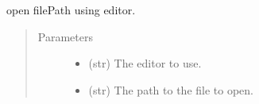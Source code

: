 \documentclass[a4paper,10pt,english]{sphinxmanual}
\begin{document}
\begin{fulllineitems}
\label{\detokenize{apidoc_src/src:src.system.show_in_editor}}
open filePath using editor.
\begin{quote}\begin{description}
\item[{Parameters}] \leavevmode\begin{itemize}
\item {} 
 \textendash{} (str) The editor to use.

\item {} 
 \textendash{} (str) The path to the file to open.

\end{itemize}

\end{description}\end{quote}

\end{fulllineitems}

\end{document}
